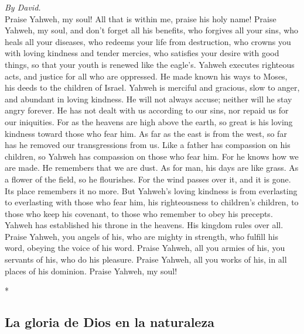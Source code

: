 \begin{paracol}{2}
\begin{otherlanguage}{english}
\emph{By David.}\\
 Praise Yahweh, my soul! All that is within me, praise his
holy name!  Praise Yahweh, my soul, and don't forget all
his benefits,  who forgives all your sins, who heals all
your diseases,  who redeems your life from destruction,
who crowns you with loving kindness and tender mercies, 
who satisfies your desire with good things, so that your youth is
renewed like the eagle's.  Yahweh executes righteous acts,
and justice for all who are oppressed.  He made known his
ways to Moses, his deeds to the children of Israel. 
Yahweh is merciful and gracious, slow to anger, and abundant in loving
kindness.  He will not always accuse; neither will he stay
angry forever.  He has not dealt with us according to our
sins, nor repaid us for our iniquities.  For as the
heavens are high above the earth, so great is his loving kindness toward
those who fear him.  As far as the east is from the west,
so far has he removed our transgressions from us.  Like a
father has compassion on his children, so Yahweh has compassion on those
who fear him.  For he knows how we are made. He remembers
that we are dust.  As for man, his days are like grass.
As a flower of the field, so he flourishes.  For the wind
passes over it, and it is gone. Its place remembers it no more.
 But Yahweh's loving kindness is from everlasting to
everlasting with those who fear him, his righteousness to children's
children,  to those who keep his covenant, to those who
remember to obey his precepts.  Yahweh has established
his throne in the heavens. His kingdom rules over all. 
Praise Yahweh, you angels of his, who are mighty in strength, who
fulfill his word, obeying the voice of his word.  Praise
Yahweh, all you armies of his, you servants of his, who do his pleasure.
 Praise Yahweh, all you works of his, in all places of
his dominion. Praise Yahweh, my soul!

\end{otherlanguage}

\switchcolumn[0]*

\hypertarget{la-gloria-de-dios-en-la-naturaleza}{%
\subsection{La gloria de Dios en la
naturaleza}\label{la-gloria-de-dios-en-la-naturaleza}}


\end{paracol}
